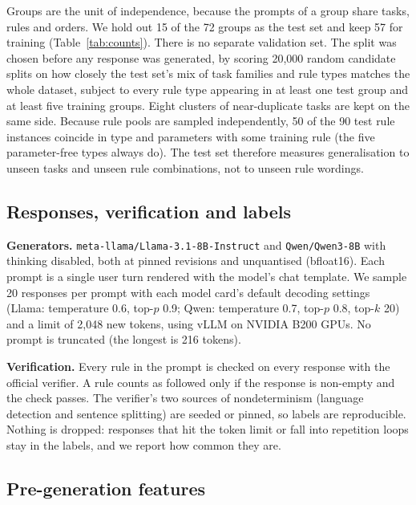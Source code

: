 \documentclass[10pt]{article}
\begin{document}
Groups are the unit of independence, because the prompts of a group share tasks, rules and orders. We hold out 15 of
the 72 groups as the test set and keep 57 for training (Table~\ref{tab:counts}). There is no separate validation set.
The split was chosen before any response was generated, by scoring 20,000 random candidate splits on how closely the
test set's mix of task families and rule types matches the whole dataset, subject to every rule type appearing in at
least one test group and at least five training groups. Eight clusters of near-duplicate tasks are kept on the same
side. Because rule pools are sampled independently, 50 of the 90 test rule instances coincide in type and parameters
with some training rule (the five parameter-free types always do). The test set therefore measures generalisation to
unseen tasks and unseen rule combinations, not to unseen rule wordings.

\subsection{Responses, verification and labels}

\textbf{Generators.} \texttt{meta-llama/Llama-3.1-8B-Instruct} \citep{grattafiori2024llama3} and
\texttt{Qwen/Qwen3-8B} \citep{yang2025qwen3} with thinking disabled, both at pinned revisions and unquantised (bfloat16).
Each prompt is a single user turn rendered with the model's chat template. We sample 20 responses per prompt with each
model card's default decoding settings (Llama: temperature 0.6, top-$p$ 0.9; Qwen: temperature 0.7, top-$p$ 0.8,
top-$k$ 20) and a limit of 2,048 new tokens, using vLLM \citep{kwon2023vllm} on NVIDIA B200 GPUs. No prompt is
truncated (the longest is 216 tokens).

\textbf{Verification.} Every rule in the prompt is checked on every response with the official verifier. A rule counts
as followed only if the response is non-empty and the check passes. The verifier's two sources of nondeterminism
(language detection and sentence splitting) are seeded or pinned, so labels are reproducible. Nothing is dropped:
responses that hit the token limit or fall into repetition loops stay in the labels, and we report how common they
are.

\subsection{Pre-generation features}
\label{sec:features}
\end{document}
